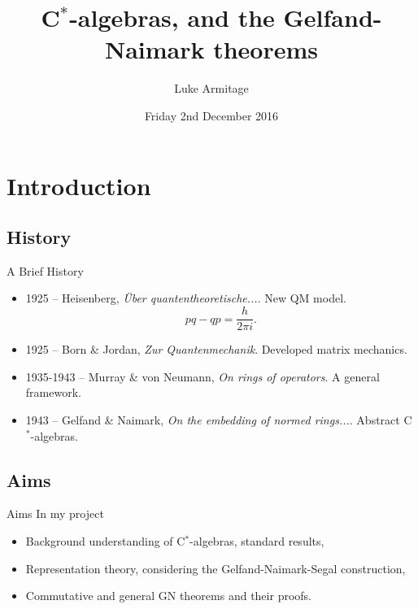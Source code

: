 \documentclass{beamer}
\title[Hypergraphs]
{C$^\ast$-algebras, and the Gelfand-Naimark theorems}
\author[L. Armitage] 
{Luke Armitage}
\date{Friday 2nd December 2016}
\begin{document}
\begin{frame}
  	\titlepage
\end{frame}


\section{Introduction}
\subsection{History}
\begin{frame}{A Brief History}{} %
 \begin{itemize}
	\item 1925 -- Heisenberg, 					
		\emph{\"{U}ber quantentheoretische...}.
		 New QM model.						
		\[pq-qp= \frac{h} {2 \pi i}.\]			
										
	\item 1925 -- Born \& Jordan,
		\emph{Zur Quantenmechanik}.		
		 Developed matrix mechanics.		
		 		
	\item 1935-1943 -- Murray \& von Neumann,
		\emph{On rings of operators}.
			A general framework. 				
 	\item 1943 -- Gelfand \& Naimark,
  		\emph{On the embedding of normed rings...}.
  		 Abstract C$^\ast$-algebras. 				  
  		
 \end{itemize}
\end{frame}


\subsection{Aims}
\begin{frame}{Aims} 
 In my project
 \begin{itemize}
 	\item Background understanding of C$^\ast$-algebras, standard results,	
 	\item Representation theory, considering the Gelfand-Naimark-Segal construction, 				
 	\item Commutative and general GN theorems and their proofs.					
 \end{itemize}
\end{frame}
\end{document}
